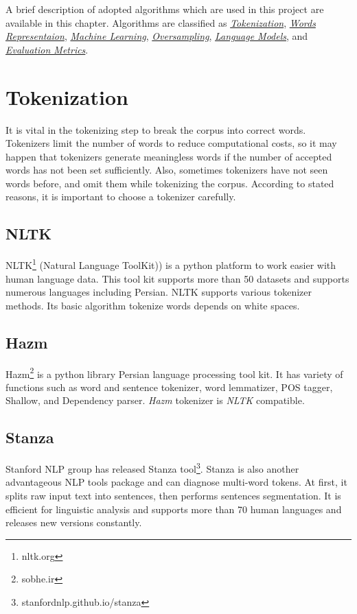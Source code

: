 A brief description of adopted algorithms which are used in this project are available in this chapter. Algorithms are classified as \textit{\hyperref[lr:tokenization]{Tokenization}}, \textit{\hyperref[lr:wordrep]{Words Representaion}}, 
\textit{\hyperref[lr:ml]{Machine Learning}},  
\textit{\hyperref[lr:oversampling]{Oversampling}},  
\textit{\hyperref[lr:lm]{Language Models}}, and  
\textit{\hyperref[lr:evalmetrics]{Evaluation Metrics}}. 
\section{Tokenization}
\label{lr:tokenization}
It is vital in the tokenizing step to break the corpus into correct words. Tokenizers limit the number of words to reduce computational costs, so it may happen that tokenizers generate meaningless words if the number of accepted words has not been set sufficiently. Also, sometimes tokenizers have not seen words before, and omit them while tokenizing the corpus. According to stated reasons, it is important to choose a tokenizer carefully.

\subsection{NLTK}
NLTK\footnote{nltk.org} (Natural Language ToolKit)) is a python platform to work easier with human language data. This tool kit supports more than 50 datasets and supports numerous languages including Persian. \ac{NLTK} supports various tokenizer methods. Its basic algorithm tokenize words depends on white spaces.

\subsection{Hazm}
Hazm\footnote{\label{fn:hazm}sobhe.ir} is a python library Persian language processing tool kit. It has variety of functions such as word and sentence tokenizer, word lemmatizer, POS tagger, Shallow, and Dependency parser. \textit{Hazm} tokenizer is \textit{\ac{NLTK}} compatible.
		
\subsection{Stanza}
Stanford NLP group has released Stanza tool\footnote{stanfordnlp.github.io/stanza}. Stanza is also another advantageous NLP tools package and can diagnose multi-word tokens. At first, it splits raw input text into sentences, then performs sentences segmentation. It is efficient for linguistic analysis and supports more than 70 human languages and releases new versions constantly.
	
